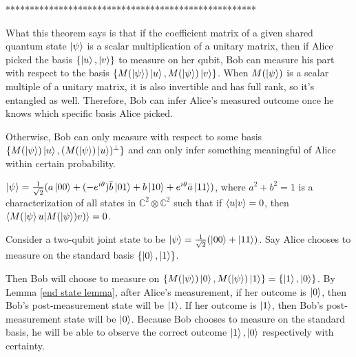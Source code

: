 ****************************************************


What this theorem says is that if the coefficient matrix of a given shared quantum state $\ket{\psi}$ is a scalar multiplication of a unitary matrix, then if Alice picked the basis $\{\ket{u}, \ket{v}\}$ to measure on her qubit, Bob can measure his part with respect to the basis $\{M(\ket{\psi})\ket{u}, M(\ket{\psi})\ket{v}\}$. When $M(\ket{\psi})$ is a scalar multiple of a unitary matrix, it is also invertible and has full rank, so it's entangled as well. Therefore, Bob can infer Alice's measured outcome once he knows which specific basis Alice picked.

Otherwise, Bob can only measure with respect to some basis $\{M(\ket{\psi})\ket{u}, (M(\ket{\psi})\ket{u})^\perp \}$ and can only infer something meaningful of Alice within certain probability.


\begin{corollary}
$\ket{\psi}=\frac{1}{\sqrt{2}}(a\ket{00}+(-e^{i\theta})\Bar{b}\ket{01}+b\ket{10}+e^{i\theta}\Bar{a}\ket{11})$, where $a^2+b^2=1$ is a characterization of all states in $\mathbb{C}^2 \otimes \mathbb{C}^2$ such that if $\braket{u|v}=0$, then $\braket{M(\ket{\psi}u|M(\ket{\psi})v)}=0$.
\end{corollary}

\begin{example}
Consider a two-qubit joint state to be $\ket{\psi}=\frac{1}{\sqrt{2}}(\ket{00}+\ket{11})$. Say Alice chooses to measure on the standard basis $\{\ket{0}, \ket{1}\}$.
\end{example}
Then Bob will choose to measure on $\{M(\ket{\psi})\ket{0}, M(\ket{\psi})\ket{1}\}=\{\ket{1}, \ket{0}\}$. By Lemma \ref{end state lemma}, after Alice's measurement, if her outcome is $\ket{0}$, then Bob's post-measurement state will be $\ket{1}$. If her outcome is $\ket{1}
$, then Bob's post-measurement state will be $\ket{0}$. Because Bob chooses to measure on the standard basis, he will be able to observe the correct outcome $\ket{1}, \ket{0}$ respectively with certainty.

